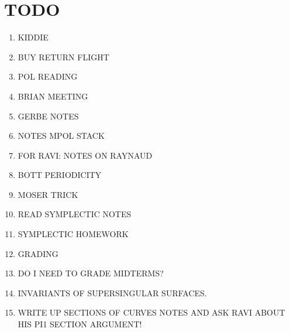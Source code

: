 \documentclass[12pt]{article}
\begin{document}
\section{TODO}

\begin{enumerate}
\item KIDDIE
\item BUY RETURN FLIGHT
\item POL READING
\item BRIAN MEETING
\item GERBE NOTES
\item NOTES MPOL STACK
\item FOR RAVI: NOTES ON RAYNAUD
\item BOTT PERIODICITY
\item MOSER TRICK
\item READ SYMPLECTIC NOTES
\item SYMPLECTIC HOMEWORK
\item GRADING
\item DO I NEED TO GRADE MIDTERMS?
\item INVARIANTS OF SUPERSINGULAR SURFACES.
\item WRITE UP SECTIONS OF CURVES NOTES AND ASK RAVI ABOUT HIS PI1 SECTION ARGUMENT!
\end{enumerate}
\end{document}
